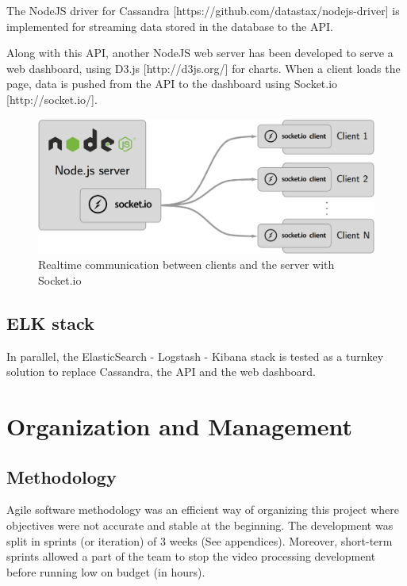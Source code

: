 \documentclass[11pt]{article}
\begin{document}
The \textsf{NodeJS} driver for \textsf{Cassandra} [https://github.com/datastax/nodejs-driver] is implemented for streaming data stored in the database to the API.

Along with this API, another \textsf{NodeJS} web server has been developed to serve a web dashboard, using \textsf{D3.js} [http://d3js.org/] for charts. When a client loads the page, data is pushed from the API to the dashboard using \textsf{Socket.io} [http://socket.io/]. 

\begin{figure}[h!]
    \centering
    \includegraphics[scale=0.12]{img/api-dashboard-socket.png}
    \caption{Realtime communication between clients and the server with \textsf{Socket.io}}
    \label{socket}
\end{figure}

\subsection{ELK stack}

In parallel, the \textsf{ElasticSearch} - \textsf{Logstash} - \textsf{Kibana} stack is tested as a turnkey solution to replace \textsf{Cassandra}, the API and the web dashboard. %

\section{Organization and Management}

\subsection{Methodology}

Agile software methodology was an efficient way of organizing this project where objectives were not accurate and stable at the beginning. The development was split in sprints (or iteration) of 3 weeks (See appendices).
Moreover, short-term sprints allowed a part of the team to stop the video processing development before running low on budget (in hours).
\end{document}
